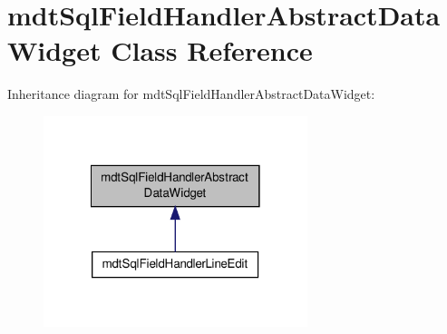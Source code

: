 \hypertarget{classmdt_sql_field_handler_abstract_data_widget}{\section{mdt\-Sql\-Field\-Handler\-Abstract\-Data\-Widget Class Reference}
\label{classmdt_sql_field_handler_abstract_data_widget}
}


Inheritance diagram for mdt\-Sql\-Field\-Handler\-Abstract\-Data\-Widget\-:\nopagebreak
\begin{figure}[H]
\begin{center}
\leavevmode
\includegraphics[width=218pt]{classmdt_sql_field_handler_abstract_data_widget__inherit__graph}
\end{center}
\end{figure}
